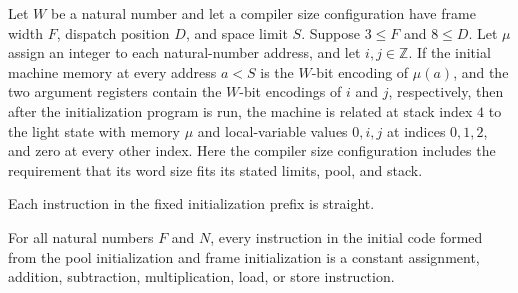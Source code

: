\begin{theorem}
\label{Light.Compiler.rel_startMem}
\leanok
{}
Let $W$ be a natural number and let a compiler size configuration have frame width $F$,
dispatch position $D$, and space limit $S$. Suppose $3\le F$ and $8\le D$. Let $\mu$
assign an integer to each natural-number address, and let $i,j\in\mathbb Z$. If the
initial machine memory at every address $a<S$ is the $W$-bit encoding of $\mu(a)$, and
the two argument registers contain the $W$-bit encodings of $i$ and $j$, respectively,
then after the initialization program is run, the machine is related at stack index $4$
to the light state with memory $\mu$ and local-variable values $0,i,j$ at indices
$0,1,2$, and zero at every other index. Here the compiler size configuration includes
the requirement that its word size fits its stated limits, pool, and stack.
\end{theorem}

\begin{theorem}
\label{Light.Compiler.straight_headStraight}
\leanok
{}
Each instruction in the fixed initialization prefix is straight.
\end{theorem}

\begin{theorem}
\label{Light.Compiler.straight_startStraight}
\leanok
{}
For all natural numbers $F$ and $N$, every instruction in the initial code formed from
the pool initialization and frame initialization is a constant assignment, addition,
subtraction, multiplication, load, or store instruction.
\end{theorem}

